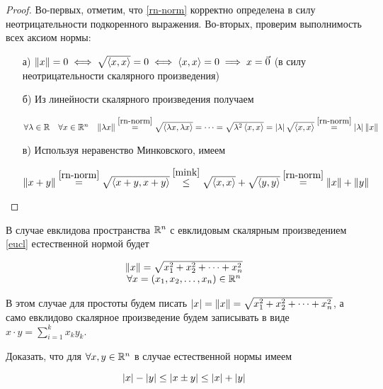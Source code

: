 \documentclass[../../main.tex]{subfiles}
\begin{document}
\begin{proof}
 Во-первых, отметим, что \eqref{rn-norm} корректно определена в силу 
 неотрицательности подкоренного выражения. Во-вторых, проверим
 выполнимость всех аксиом нормы:
 
 \begin{enumerate}
  \item[а)]
  $\lVert{x}\rVert = 0 \iff \sqrt{\left<x, x\right>} = 0 \iff
  \left<x, x\right> = 0 \implies x = \vec 0$ (в силу 
  неотрицательности скалярного произведения)
  
  \item[б)]
  Из линейности скалярного произведения получаем
  
  $\forall \lambda \in \mathbb{R} \quad \forall x \in \mathbb{R}^n \quad
   \lVert{\lambda x}\rVert \stackrel{\eqref{rn-norm}}{=}
   \sqrt{\left<\lambda x, \lambda x\right>} = \dots =
   \sqrt{\lambda^2\left<x, x\right>} =
   \left|{\lambda}\right| \sqrt{\left<x, x\right>} \stackrel{\eqref{rn-norm}}{=}
   \left|{\lambda}\right| \lVert{x}\rVert$
 
  \item[в)]
  Используя неравенство Минковского, имеем
  
  $\lVert{x+y}\rVert \stackrel{\eqref{rn-norm}}{=}
   \sqrt{\left<x+y, x+y\right>} \stackrel{\eqref{mink}}{\le}
   \sqrt{\left<x, x\right>} + \sqrt{\left<y, y\right>}
   \stackrel{\eqref{rn-norm}}{=} \lVert{x}\rVert + \lVert{y}\rVert$
 \end{enumerate}
 
\end{proof}

\begin{rem}
 В случае евклидова пространства $\mathbb{R}^n$ с евклидовым скалярным 
 произведением \eqref{eucl} естественной нормой будет
 
 \[\begin{array}{c}
    \lVert{x}\rVert = \sqrt{x_1^2 + x_2^2 + \dots + x_n^2} \\
    \forall x = (x_1, x_2, \dots, x_n) \in \mathbb{R}^n
   \end{array}\]
   
 В этом случае для простоты будем писать $\left|{x}\right| = \lVert{x}\rVert = 
 \sqrt{x_1^2 + x_2^2 + \dots + x_n^2}$, а само евклидово скалярное
 произведение будем записывать в виде $x\cdot y = \sum\limits_{i=1}^k 
 x_ky_k$.

\end{rem}

\begin{exc}
  Доказать, что для $\forall x, y \in \mathbb{R}^n$ в случае естественной нормы
  имеем
  
  \[\left|{x}\right| - \left|{y}\right| \le \left|{x \pm y}\right| \le \left|{x}\right| + \left|{y}\right|\]
\end{exc}
\end{document}
